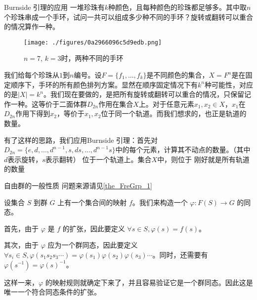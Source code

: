 \begin{example}{Burnside 引理的应用}
一堆珍珠有$k$种颜色，且每种颜色的珍珠都足够多。其中取$n$个珍珠串成一个手环，试问一共可以组成多少种不同的手环？旋转或翻转可以重合的情况算作一种。

\begin{figure}[ht]
\centering
\texttt{[image: ./figures/0a2966096c5d9edb.png]}
\caption{$n=7$, $k=3$时，两种不同的手环} \label{fig_GroupP_1}
\end{figure}

我们给每个珍珠从$1$到$n$编号。设$F=\{f_1,...,f_k\}$是不同颜色的集合，$X=F^n$是在固定顺序下，手环的所有颜色排列方案。显然在顺序固定情况下有$k^n$种可能性，对应的是$|X|=k^n$。我们现在要做的，是把所有旋转或翻转可以重合的情况，只保留记作一种。这等价于二面体群$D_{2n}$作用在集合$X$上。对于任意元素$x_1,x_2\in X$，$x_1$在$D_{2n}$作用下得到$x_2$，等价于$x_1,x_2$位于同一个轨道。而我们想求的，也正是轨道的数量。

有了这样的思路，我们应用Burnside 引理：首先对$D_{2n}=\{e,d,...,d^{n-1},s,ds,...,d^{n-1}s\}$中的每个元素，计算其不动点的数量。（其中$d$表示旋转，$s$表示翻转）
位于一个轨道上。集合$X$中，则位于
刚好就是所有轨道的数量
 
\end{example}




\begin{example}{自由群的一般性质}\label{ex_GroupP_4}
问题来源请见\autoref{the_FreGrp_1}~

设集合 $S$ 到群 $G$ 上有一个集合间的映射 $f$。我们来构造一个 $\varphi: F(S)\rightarrow G$ 的同态。

首先，由于 $\varphi$ 是 $f$ 的扩张，因此要定义 $\forall s\in S, \varphi(s)=f(s)$。

其次，由于 $\varphi$ 应为一个群同态，因此要定义 $\forall s_i\in S, \varphi({s_1s_2s_3\cdots})=\varphi(s_1)\varphi(s_2)\varphi(s_3)\cdots$。同时，还需要有 $\varphi(s^{-1})=\varphi(s)^{-1}$。

这样一来，$\varphi$ 的映射规则就确定下来了，并且容易验证它是一个群同态。因此这是唯一一个符合同态条件的扩张。


\end{example}

